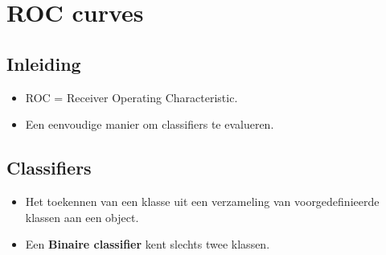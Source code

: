 \chapter{ROC curves}
\section{Inleiding}
\begin{itemize}
	\item ROC = Receiver Operating Characteristic.
	\item Een eenvoudige manier om classifiers te evalueren.
\end{itemize}

\section{Classifiers}
\begin{itemize}
	\item Het toekennen van een klasse uit een verzameling van voorgedefinieerde klassen aan een object.
	\item Een \textbf{Binaire classifier} kent slechts twee klassen. 
\end{itemize}


